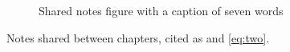 \begin{figure}
\centering
\caption{Shared notes figure with a caption of seven words}
\end{figure}

Notes shared between chapters, cited as \cite{knuth1984} and \ref{eq:two}.
